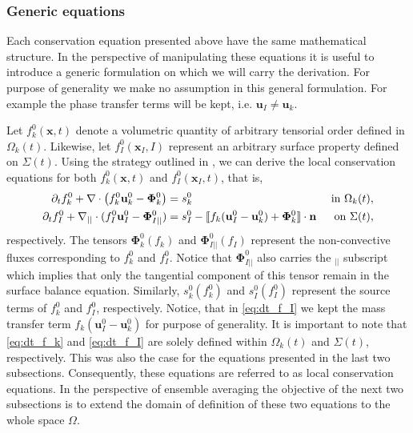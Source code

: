 \subsubsection{Generic equations}

Each conservation equation presented above have the same mathematical structure. 
In the perspective of manipulating these equations it is useful to introduce a generic formulation on which we will carry the derivation.
For purpose of generality we make no assumption in this general formulation. 
For example the phase transfer terms will be kept, i.e. $\textbf{u}_I \neq \textbf{u}_k$. 

Let $f_k^0(\textbf{x},t)$ denote a volumetric quantity of arbitrary tensorial order defined in $\Omega_k(t)$.
Likewise, let $f_I^0(\textbf{x}_I,I)$ represent an arbitrary surface property defined on $\Sigma(t)$.
Using the strategy outlined in \citep{bothe2022sharp,morel2015mathematical,slattery2007interfacial}, we can derive the local conservation equations for both $f_k^0(\textbf{x},t)$ and $f_I^0(\textbf{x}_I,t)$, that is,  
\begin{align}
    \label{eq:dt_f_k}
    \partial_t f_k^0
    +\mathbf{\nabla}\cdot \left(
        f_k^0\textbf{u}_k^0
        - \mathbf{\Phi}_k^0
        \right)
    &= 
    s_k^0
    & \text{ in } \Omega_k(t),&\\
    \partial_t f_I^0 
    +\mathbf{\nabla}_{||}\cdot
    (
        f_I^0 \textbf{u}_I^0
        - \mathbf{\Phi}_{I||}^0 
    )
    &= 
    s_I^0
    - \llbracket 
        f_k (\textbf{u}_I^0 - \textbf{u}_k^0)
        + \mathbf{\Phi}_k^0
      \rrbracket \cdot \textbf{n} 
    & \text{ on } \Sigma(t),&
    \label{eq:dt_f_I}
\end{align}
respectively.
The tensors $\mathbf{\Phi}_k^0(f_k)$ and $\mathbf{\Phi}_{I||}^0(f_I)$ represent the non-convective fluxes corresponding to $f_k^0$ and $f_I^0$. 
Notice that $\mathbf{\Phi}_{I||}^0$ also carries the $_{||}$ subscript which implies that only the tangential component of this tensor remain in the surface balance equation. 
Similarly, $s_k^0(f_k^0)$ and $s_I^0(f_I^0)$ represent the source terms of $f_k^0$ and $f_I^0$, respectively.
Notice, that in \ref{eq:dt_f_I} we kept the mass transfer term $f_k (\textbf{u}_I^0 - \textbf{u}_k^0)$ for purpose of generality. 
It is important to note that \ref{eq:dt_f_k} and \ref{eq:dt_f_I} are solely defined within $\Omega_k(t)$ and $\Sigma(t)$, respectively.
This was also the case for the equations presented in the last two subsections. 
Consequently, these equations are referred to as local conservation equations.
In the perspective of ensemble averaging the objective of the next two subsections is to extend the domain of definition of these two equations to the whole space $\Omega$.

